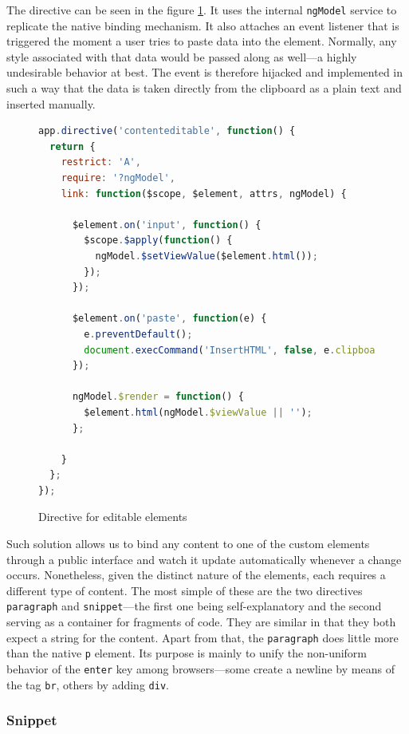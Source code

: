 \documentclass[thesis=M,english,hidelinks]{FITthesis}[2012/10/20]
\newcommand{\code}{\texttt}
\begin{document}
The directive can be seen in the figure \ref{fig:contenteditable_directive}. It uses the internal \code{ngModel} service to replicate the native binding mechanism. It also attaches an event listener that is triggered the moment a user tries to paste data into the element. Normally, any style associated with that data would be passed along as well---a highly undesirable behavior at best. The event is therefore hijacked and implemented in such a way that the data is taken directly from the clipboard as a plain text and inserted manually.

\begin{figure}[h]
  \begin{lstlisting}[language=JavaScript]
app.directive('contenteditable', function() {
  return {
    restrict: 'A',
    require: '?ngModel',
    link: function($scope, $element, attrs, ngModel) {

      $element.on('input', function() {
        $scope.$apply(function() {
          ngModel.$setViewValue($element.html());
        });
      });

      $element.on('paste', function(e) {
        e.preventDefault();
        document.execCommand('InsertHTML', false, e.clipboardData.getData('text/plain'));
      });

      ngModel.$render = function() {
        $element.html(ngModel.$viewValue || '');
      };

    }
  };
});
  \end{lstlisting}
  \caption{Directive for editable elements}
  \label{fig:contenteditable_directive}
\end{figure}

Such solution allows us to bind any content to one of the custom elements through a public interface and watch it update automatically whenever a change occurs. Nonetheless, given the distinct nature of the elements, each requires a different type of content. The most simple of these are the two directives \code{paragraph} and \code{snippet}---the first one being self-explanatory and the second serving as a container for fragments of code. They are similar in that they both expect a string for the content. Apart from that, the \code{paragraph} does little more than the native \code{p} element. Its purpose is mainly to unify the non-uniform behavior of the \code{enter} key among browsers---some create a newline by means of the tag \code{br}, others by adding \code{div}.

      \subsubsection{Snippet}
\end{document}
